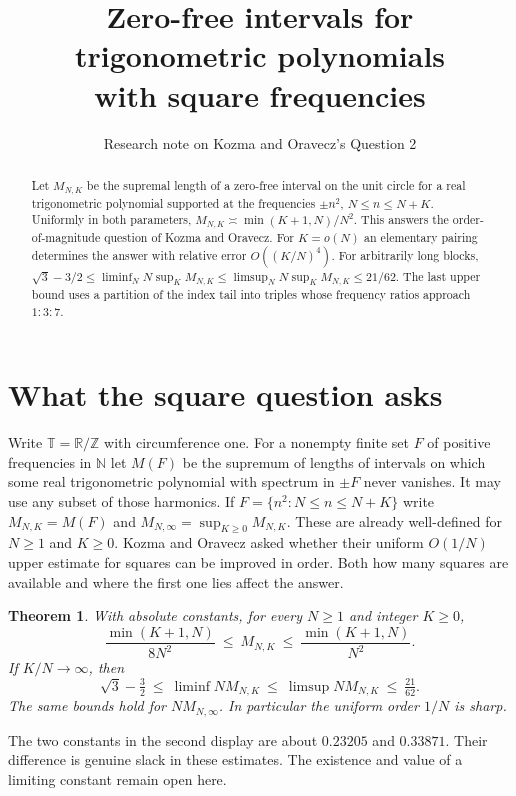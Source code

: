 \documentclass[11pt]{article}
\title{Zero-free intervals for trigonometric polynomials\\with square frequencies}
\author{Research note on Kozma and Oravecz's Question 2}
\date{}
\newtheorem{theorem}{Theorem}\newtheorem{lemma}[theorem]{Lemma}
\newcommand{\T}{\mathbb T}
\newcommand{\R}{\mathbb R}
\begin{document}
\maketitle
\begin{abstract}
Let $M_{N,K}$ be the supremal length of a zero-free interval on the unit circle for a real trigonometric polynomial supported at the frequencies $\pm n^2$, $N\le n\le N+K$. Uniformly in both parameters, $M_{N,K}\asymp\min(K+1,N)/N^2$. This answers the order-of-magnitude question of Kozma and Oravecz. For $K=o(N)$ an elementary pairing determines the answer with relative error $O((K/N)^4)$. For arbitrarily long blocks, $\sqrt3-3/2\le\liminf_N N\sup_K M_{N,K}\le\limsup_N N\sup_K M_{N,K}\le21/62$. The last upper bound uses a partition of the index tail into triples whose frequency ratios approach $1:3:7$.
\end{abstract}

\section{What the square question asks}
Write $\T=\R/\mathbb Z$ with circumference one. For a nonempty finite set $F$ of positive frequencies in $\mathbb N$ let $M(F)$ be the supremum of lengths of intervals on which some real trigonometric polynomial with spectrum in $\pm F$ never vanishes. It may use any subset of those harmonics. If $F=\{n^2:N\le n\le N+K\}$ write $M_{N,K}=M(F)$ and $M_{N,\infty}=\sup_{K\ge0}M_{N,K}$. These are already well-defined for $N\ge1$ and $K\ge0$. Kozma and Oravecz \cite[Question 2]{ko} asked whether their uniform $O(1/N)$ upper estimate for squares can be improved in order. Both how many squares are available and where the first one lies affect the answer.

\begin{theorem}\label{main}
With absolute constants, for every $N\ge1$ and integer $K\ge0$,
\[
 \frac{\min(K+1,N)}{8N^2}\ \le\ M_{N,K}\ \le\ \frac{\min(K+1,N)}{N^2}.
\]
If $K/N\to\infty$, then
\[
 \sqrt3-\tfrac32\ \le\ \liminf NM_{N,K}
 \ \le\ \limsup NM_{N,K}\ \le\ \tfrac{21}{62}.
\]
The same bounds hold for $NM_{N,\infty}$. In particular the uniform order $1/N$ is sharp.
\end{theorem}
The two constants in the second display are about $0.23205$ and $0.33871$. Their difference is genuine slack in these estimates. The existence and value of a limiting constant remain open here.
\end{document}
